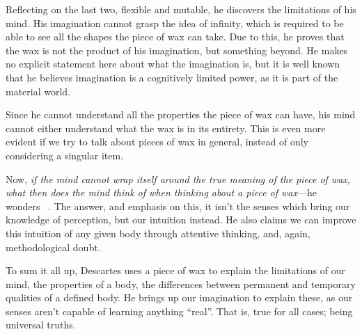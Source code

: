 \documentclass{assignment}
\begin{document}
\begin{answer}
Reflecting on the last two, flexible and mutable, he discovers the limitations of his mind. His imagination cannot grasp the idea of infinity, which is required to be able to see all the shapes the piece of wax can take. Due to this, he proves that the wax is not the product of his imagination, but something beyond. He makes no explicit statement here about what the imagination is, but it is well known \autocite{limitedimagination} that he believes imagination is a cognitively limited power, as it is part of the material world.

Since he cannot understand all the properties the piece of wax can have, his mind cannot either understand what the wax is in its entirety. This is even more evident if we try to talk about pieces of wax in general, instead of only considering a singular item.

Now, \emph{if the mind cannot wrap itself around the true meaning of the piece of wax, what then does the mind think of when thinking about a piece of wax}---he wonders~\autocite{unipaper}
. The answer, and emphasis on this, it isn’t the senses which bring our knowledge of perception, but our intuition instead. He also claims we can improve this intuition of any given body through attentive thinking, and, again, methodological doubt.

\vspace*{1\baselineskip}
To sum it all up, Descartes uses a piece of wax to explain the limitations of our mind, the properties of a body, the differences between permanent and temporary qualities of a defined body. He brings up our imagination to explain these, as our senses aren’t capable of learning anything “real”. That is, true for all cases; being universal truths.
\end{answer}

\printbibliography
\end{document}
